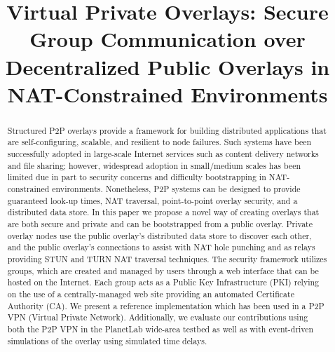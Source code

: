 \documentclass[conference]{IEEEtran}
\begin{document}
\title{Virtual Private Overlays: Secure Group Communication over Decentralized
Public Overlays in NAT-Constrained Environments}

\author{ 
}

\maketitle

\begin{abstract}
Structured P2P overlays provide a framework for building distributed applications that
are self-configuring, scalable, and resilient to node failures.  Such systems
have been successfully adopted in large-scale Internet services such as content
delivery networks and file sharing; however, widespread adoption in small/medium
scales has been limited due in part to security concerns and difficulty
bootstrapping in NAT-constrained environments.  Nonetheless, P2P systems can be designed to
provide guaranteed look-up times, NAT traversal, point-to-point overlay
security, and a distributed data store. In this paper we propose
a novel way of creating overlays that are both secure and
private and can be bootstrapped from a public overlay.
Private overlay nodes use the public overlay's distributed data store to discover
each other, and the public overlay's connections to assist with NAT hole punching
and as relays providing STUN and TURN NAT traversal techniques.  The security
framework utilizes groups, which are created and managed by users through
a web interface that can be hosted on the Internet.
Each group acts as a Public Key Infrastructure (PKI) relying on
the use of a centrally-managed web site providing an automated Certificate
Authority (CA).  We present a reference implementation which has been used in
a P2P VPN (Virtual Private Network).  Additionally, we evaluate our contributions using
both the P2P VPN in the PlanetLab wide-area testbed as well as with event-driven
simulations of the overlay using simulated time delays.
\end{abstract}
\end{document}
